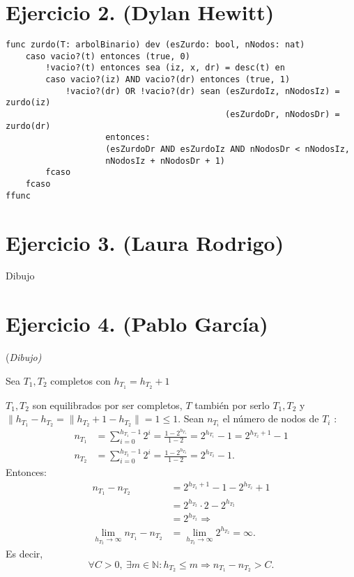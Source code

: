\documentclass[10pt,a4paper,openright]{book}
\theoremstyle{break}
\begin{document}
\section{Ejercicio 2. (Dylan Hewitt)}%
\label{sec:ejercicio_2_dylan_hewitt_}
\begin{lstlisting}
func zurdo(T: arbolBinario) dev (esZurdo: bool, nNodos: nat)
    caso vacio?(t) entonces (true, 0)
        !vacio?(t) entonces sea (iz, x, dr) = desc(t) en 
        caso vacio?(iz) AND vacio?(dr) entonces (true, 1)
            !vacio?(dr) OR !vacio?(dr) sean (esZurdoIz, nNodosIz) = zurdo(iz)
                                            (esZurdoDr, nNodosDr) = zurdo(dr) 
                    entonces: 
                    (esZurdoDr AND esZurdoIz AND nNodosDr < nNodosIz, 
                    nNodosIz + nNodosDr + 1)
        fcaso
    fcaso
ffunc
\end{lstlisting}

\section{Ejercicio 3. (Laura Rodrigo)}%
\label{sec:ejercicio_3_laura_rodrigo}
Dibujo

\section{Ejercicio 4. (Pablo García)}%
\label{sec:ejercicio_4_pablo_garcia_}
(\textit{Dibujo)}

Sea $T_1, T_2$ completos con $h_{T_1} = h_{T_2} + 1$

$T_1, T_2$ son equilibrados por ser completos, $T$ también por serlo $T_1, T_2$ y $\| h_{T_1} - h_{T_2} = \|h_{T_2} + 1 - h_{T_2} \| = 1 \le 1$. Sean $n_{T_i}$ el número de nodos de $T_i$ : 
\begin{align*}
    n_{T_1} &= \sum_{i=0}^{h_{T_1} - 1} 2^{i} = \frac{1 - 2^{h_{T_1}}}{1 - 2} = 2^{h_{T_1}} - 1 = 2^{h_{T_2} + 1} - 1\\ 
    n_{T_2} &= \sum_{i=0}^{h_{T_2} - 1} 2^{i} = \frac{1 - 2^{h_{T_2}}}{1 - 2} = 2^{h_{T_2}} - 1
.\end{align*}
Entonces: 
\begin{align*}
    n_{T_1} - n_{T_2} &= 2^{h_{T_2} + 1} - 1 - 2^{h_{T_2}} + 1\\
                    &= 2^{h_{T_2}} \cdot 2 - 2^{h_{T_2}} \\
                    &= 2^{h_{T_2}} \Rightarrow\\
    \lim_{h_{T_2} \rightarrow \infty} n_{T_1} - n_{T_2} &= \lim_{h_{T_2} \rightarrow \infty} 2^{h_{T_2}} = \infty  
.\end{align*}
Es decir, 
\[
\forall C > 0,\ \exists m \in \mathbb{N} : h_{T_2} \le m \Rightarrow n_{T_1} - n_{T_2} > C.
\]
\end{document}
